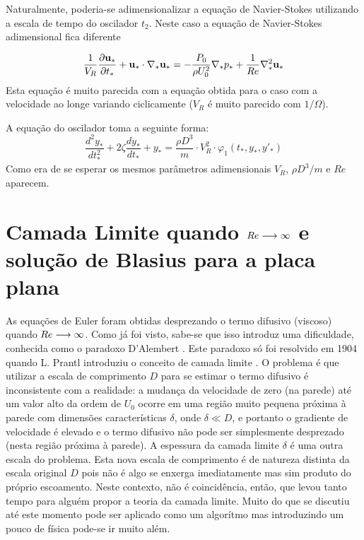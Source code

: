 Naturalmente, poderia-se adimensionalizar a equação de Navier-Stokes utilizando a escala de tempo do oscilador $t_2$. Neste caso a equação de Navier-Stokes adimensional fica diferente 

\[
\frac{1}{V_R}\frac{\partial \mathbf{u}_*}{\partial t_*} +  \mathbf{u}_*\cdot\nabla_* \mathbf{u_*} = -\frac{P_0}{\rho U_0^2}\nabla_* p_* + \frac{1}{Re}\nabla_*^2 \mathbf{u}_* 
\]
Esta equação é muito parecida com a equação obtida para o caso com a velocidade ao longe variando ciclicamente ($V_R$ é muito parecido com $1/\Omega$). 

A equação do oscilador toma a seguinte forma:
\[
\frac{d^2y_*}{dt_*^2} + 2\zeta\frac{dy_*}{dt_*} + y_* = \frac{\rho D^3}{m} \cdot V_R^2 \cdot \varphi_1\left(t_*, y_*, y'_*\right)
\]
Como era de se esperar os mesmos parâmetros adimensionais $V_R$, $\rho D^3/m$ e $Re$ aparecem.

\section{Camada Limite quando $Re\longrightarrow\infty$ e solução de Blasius para a placa plana}

As equações de Euler foram obtidas desprezando o termo difusivo (viscoso) quando $Re\longrightarrow\infty$. Como já foi visto,  sabe-se que isso introduz uma dificuldade, conhecida como o paradoxo D'Alembert \cite{Birkhoff60}. Este paradoxo só foi resolvido em 1904 quando L. Prantl introduziu  o conceito de camada limite \cite{Birkhoff60}. O problema é que utilizar a escala de comprimento $D$ para se estimar o termo difusivo é inconsistente com a realidade: a mudança da velocidade de zero (na parede) até um valor alto da ordem de $U_0$ ocorre em uma região muito pequena próxima à parede com dimensões características $\delta$, onde $\delta \ll D$, e portanto o  gradiente de velocidade é elevado e o termo difusivo não pode ser simplesmente desprezado (nesta região próxima à parede). A espessura da camada limite $\delta$ é uma outra escala do problema. Esta nova escala de comprimento é de natureza distinta da escala original $D$ pois não é algo se enxerga imediatamente mas sim produto do próprio escoamento. Neste contexto,  não é coincidência, então, que levou tanto tempo para alguém propor a teoria da camada limite. Muito do que se discutiu até este momento pode ser aplicado como um algorítmo mas introduzindo um pouco de física pode-se ir muito além.

